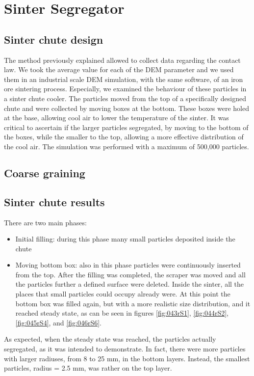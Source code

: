 
\chapter{Sinter Segregator}
\label{cap:sintersegregator}

\section{Sinter chute design}
\label{sec:sinterchutedesign}

The method previously explained allowed to collect data regarding the contact
law. We took the average value for each of the DEM parameter and we used them 
in an industrial scale DEM simulation, with the same software, 
of an iron ore sintering process. 
Especially, we examined the behaviour of these particles in a sinter chute cooler. 
The particles moved from the top of a specifically designed chute and were 
collected by moving boxes at the bottom. These boxes were holed at the base, 
allowing cool air to lower the temperature of the sinter. 
It was critical to ascertain if the larger particles segregated, 
by moving to the bottom of the boxes, while the smaller to the top, allowing a 
more effective distribution of the cool air. The simulation was performed 
with a maximum of 500,000 particles.

\section{Coarse graining}
\label{sec:coarsegraining}

\section{Sinter chute results}
\label{sec:sinterchuteresults}


There are two main phases:
\begin{itemize}
  \item{Initial filling: during this phase many small particles deposited inside
  the chute}
  \item{Moving bottom box: also in this phase particles were
continuously inserted from the top. After the filling was completed, the
scraper was moved and all the particles further a defined surface were
deleted. Inside the sinter, all the places that small particles could
occupy already were. At this point the bottom box was filled again, but
with a more realistic size distribution, and it reached steady state, as can
be seen in figures \ref{fig:043rS1}, \ref{fig:044rS2}, \ref{fig:045rS4}, and
\ref{fig:046rS6}.}
\end{itemize}
As expected, when the steady state was reached, the particles actually
segregated, as it was intended to demonstrate.
In fact, there were more particles with larger radiuses, from 8 to 25 mm, in the
bottom layers.
Instead, the smallest particles, radius = 2.5 mm, was rather on the top layer. 


